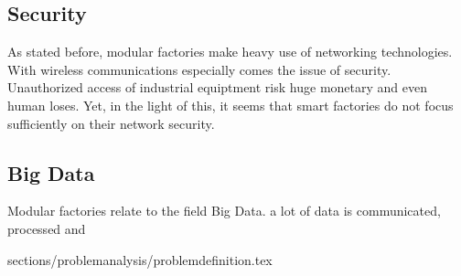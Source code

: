 \subsection{Security}
As stated before, modular factories make heavy use of networking technologies. With wireless communications especially comes the issue of security. Unauthorized access of industrial equiptment risk huge monetary and even human loses. Yet, in the light of this, it seems that smart factories do not focus sufficiently on their network security\cite{Sadeghi2015}.

\subsection{Big Data}
Modular factories relate to the field Big Data.   a lot of data is communicated, processed and 


 {sections/problemanalysis/problemdefinition.tex}

